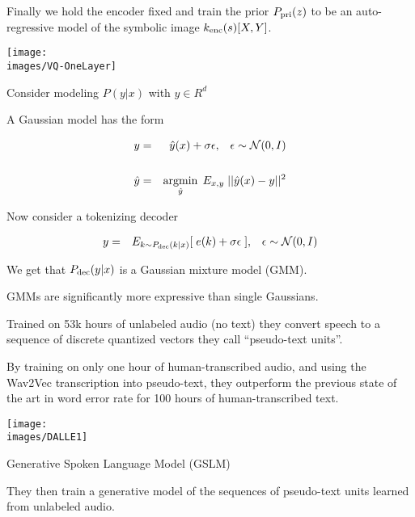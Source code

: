 {{{{

Finally we hold the encoder fixed and train the prior $P_{\mathrm{pri}}(z)$ to be an auto-regressive model of the symbolic image $k_{\mathrm{enc}}(s)[X,Y]$.

\vfill
\centerline{\texttt{[image: \\images/VQ-OneLayer]}}


Consider modeling $P(y|x)$ with $y \in R^d$

\vfill
A Gaussian model has the form

\begin{eqnarray*}
y & = & \hat{y}(x) + \sigma \epsilon,\;\;\;\epsilon \sim {\cal N}(0,I) \\
\\
\hat{y} & = & \operatorname*{argmin}_{\hat{y}}\; E_{x,y}\;||\hat{y}(x)-y||^2
\end{eqnarray*}


Now consider a tokenizing decoder

\begin{eqnarray*}
y & = & E_{k\sim P_{\mathrm{dec}}(k|x)}[\; e(k) + \sigma \epsilon\;],\;\;\;\epsilon \sim {\cal N}(0,I) \\
\end{eqnarray*}

We get that $P_{\mathrm{dec}}(y|x)$ is a Gaussian mixture model (GMM).

\vfill
GMMs are significantly more expressive than single Gaussians.

\vfill


\vfill
Trained on 53k hours of unlabeled audio (no text) they convert speech to a sequence of discrete quantized vectors they call ``pseudo-text units''.

\vfill
By training on only one hour of human-transcribed audio, and using the Wav2Vec transcription into pseudo-text, they outperform the previous state of the
art in word error rate for 100 hours of human-transcribed text.


\vfill
\centerline{\texttt{[image: \\images/DALLE1]}}



Generative Spoken Language Model (GSLM)

\vfill
They then train a generative model of the sequences of pseudo-text units learned from unlabeled audio.


}}}}
